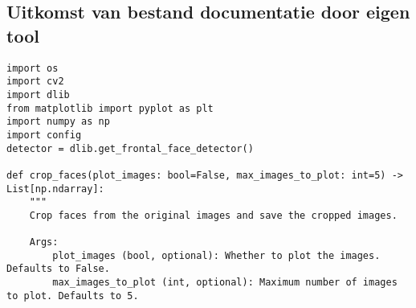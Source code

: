 \subsection{Uitkomst van bestand documentatie door eigen tool}
\begin{verbatim}
import os
import cv2
import dlib
from matplotlib import pyplot as plt
import numpy as np
import config
detector = dlib.get_frontal_face_detector()

def crop_faces(plot_images: bool=False, max_images_to_plot: int=5) -> List[np.ndarray]:
    """
    Crop faces from the original images and save the cropped images.

    Args:
        plot_images (bool, optional): Whether to plot the images. Defaults to False.
        max_images_to_plot (int, optional): Maximum number of images to plot. Defaults to 5.


\end{verbatim}
